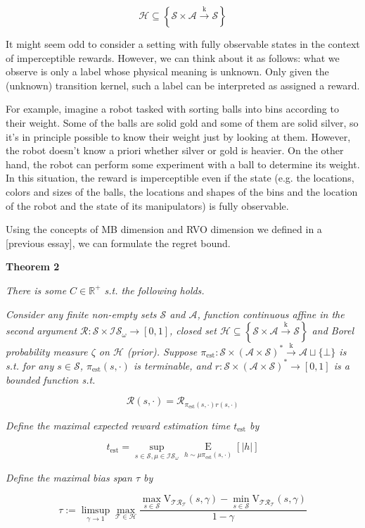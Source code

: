 \documentclass[a4paper]{article}
\newcommand{\Co}[1]{}
\newcommand{\San}[1]{}
\newcommand{\AP}[1]{\left(#1\right)}
\newcommand{\AB}[1]{\left[#1\right]}
\newcommand{\AC}[1]{\left\{#1\right\}}
\newcommand{\Ea}[2]{\underset{#1}{\operatorname{E}}\AB{#2}}
\newcommand{\Reals}{\mathbb{R}}
\newcommand{\Abs}[1]{\left\vert #1 \right\vert}
\newcommand{\K}{\xrightarrow{\mathrm{k}}}
\newcommand{\St}{\mathcal{S}}
\newcommand{\A}{\mathcal{A}}
\newcommand{\AX}{\A\sqcup\{\bot\}}
\newcommand{\FHS}{\AP{\A\times\St}^*}
\newcommand{\R}{\mathcal{R}}
\newcommand{\T}{\mathcal{T}}
\newcommand{\Hy}{\mathcal{H}}
\newcommand{\IS}{\mathcal{IS}}
\newcommand{\Est}{\mathrm{est}}
\newcommand{\PE}{\pi_\Est}
\newcommand{\V}{\mathrm{V}}
\begin{document}
$$\Hy\subseteq\AC{\St\times\A\K\St}$$

It might seem odd to consider a setting with fully observable states in the context of imperceptible rewards. However, we can think about it as follows: what we observe is only a label whose physical meaning is unknown. Only given the (unknown) transition kernel, such a label can be interpreted as assigned a reward.

For example, imagine a robot tasked with sorting balls into bins according to their weight. Some of the balls are solid gold and some of them are solid silver, so it's in principle possible to know their weight just by looking at them. However, the robot doesn't know a priori whether silver or gold is heavier. On the other hand, the robot can perform some experiment with a ball to determine its weight. In this situation, the reward is imperceptible even if the state (e.g. the locations, colors and sizes of the balls, the locations and shapes of the bins and the location of the robot and the state of its manipulators) is fully observable.

Using the concepts of MB dimension and RVO dimension we defined in a [previous essay]\San{(https://www.alignmentforum.org/posts/Qa5jG9z9dC6E4s9JH/dimensional-regret-without-resets)}, we can formulate the regret bound.

\textbf{Theorem 2}\Co{b}

\textit{There is some $C\in\Reals^+$ s.t. the following holds.}\Co{i}

\textit{Consider any finite non-empty sets $\St$ and $\A$, function continuous affine in the second argument $\R:\St\times\IS_\omega\rightarrow[0,1]$, closed set $\Hy\subseteq\AC{\St\times\A\K\St}$ and Borel probability measure $\zeta$ on $\Hy$ (prior). Suppose $\PE:\St\times\FHS\K\AX$ is s.t. for any $s\in\St$, $\PE(s,\cdot)$ is terminable, and $r:\St\times\FHS\rightarrow[0,1]$ is a bounded function s.t.}\Co{i}

$$\R(s,\cdot)=\R_{\pi_{\mathrm{est}}(s,\cdot)r(s,\cdot)}$$ 

\textit{Define the maximal expected reward estimation time $t_\Est$ by}\Co{i}

$$t_\Est=\sup_{s\in\St,\mu\in\IS_\omega}\Ea{h\sim\mu\pi_{\mathrm{est}}(s,\cdot)}{\Abs{h}}$$

\textit{Define the maximal bias span $\tau$ by}\Co{i}

$$\tau:=\limsup_{\gamma\rightarrow1}{\max_{\T\in\Hy}\frac{\max_{s\in\St}\V_{\T\R_\T}(s,\gamma)-\min_{s\in\St}\V_{\T\R_\T}(s,\gamma)}{1-\gamma}}$$
\end{document}
